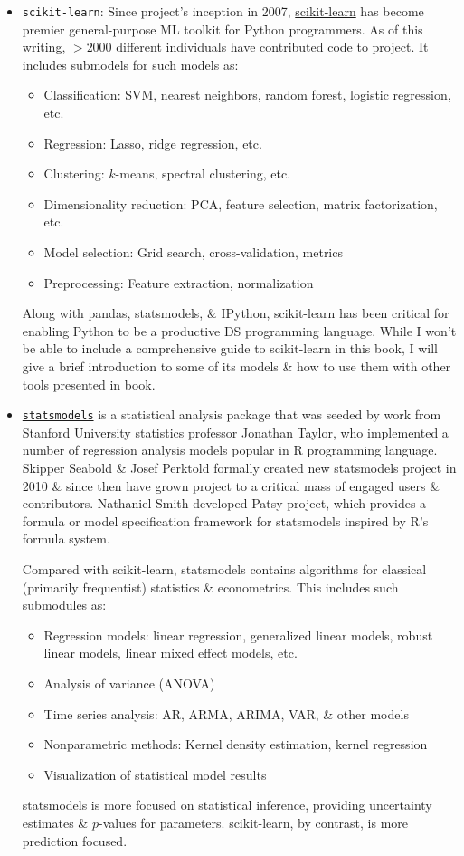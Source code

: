 \documentclass{article}
\begin{document}
\begin{itemize}
\begin{itemize}
\begin{itemize}
			\item {\tt scikit-learn}: Since project's inception in 2007, \href{https://scikit-learn.org}{scikit-learn} has become premier general-purpose ML toolkit for Python programmers. As of this writing, $> 2000$ different individuals have contributed code to project. It includes submodels for such models as:
			\begin{itemize}
				\item Classification: SVM, nearest neighbors, random forest, logistic regression, etc.
				\item Regression: Lasso, ridge regression, etc.
				\item Clustering: $k$-means, spectral clustering, etc.
				\item Dimensionality reduction: PCA, feature selection, matrix factorization, etc.
				\item Model selection: Grid search, cross-validation, metrics
				\item Preprocessing: Feature extraction, normalization
			\end{itemize}
			Along with pandas, statsmodels, \& IPython, scikit-learn has been critical for enabling Python to be a productive DS programming language. While I won't be able to include a comprehensive guide to scikit-learn in this book, I will give a brief introduction to some of its models \& how to use them with other tools presented in book.
			\item \href{https://statsmodels.org}{\tt statsmodels} is a statistical analysis package that was seeded by work from Stanford University statistics professor {\sc Jonathan Taylor}, who implemented a number of regression analysis models popular in R programming language. {\sc Skipper Seabold \& Josef Perktold} formally created new statsmodels project in 2010 \& since then have grown project to a critical mass of engaged users \& contributors. {\sc Nathaniel Smith} developed Patsy project, which provides a formula or model specification framework for statsmodels inspired by R's formula system.
			
			Compared with scikit-learn, statsmodels contains algorithms for classical (primarily frequentist) statistics \& econometrics. This includes such submodules as:
			\begin{itemize}
				\item Regression models: linear regression, generalized linear models, robust linear models, linear mixed effect models, etc.
				\item Analysis of variance (ANOVA)
				\item Time series analysis: AR, ARMA, ARIMA, VAR, \& other models
				\item Nonparametric methods: Kernel density estimation, kernel regression
				\item Visualization of statistical model results
			\end{itemize}
			statsmodels is more focused on statistical inference, providing uncertainty estimates \& $p$-values for parameters. scikit-learn, by contrast, is more prediction focused.
			

\end{itemize}
\end{itemize}
\end{itemize}
\end{document}

